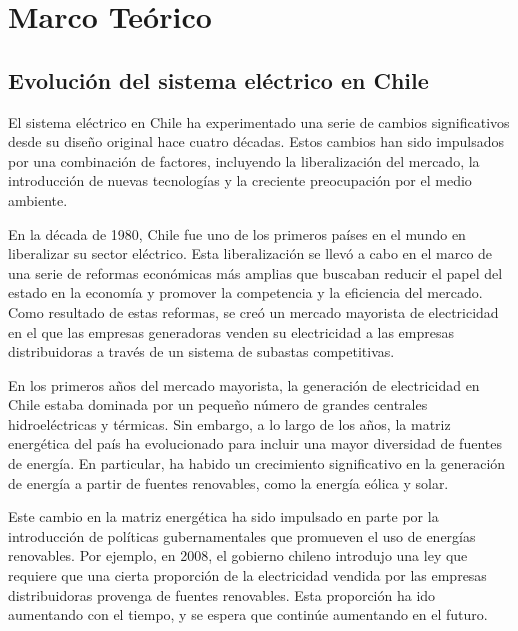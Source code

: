 
\chapter{Marco Teórico}
\label{c2} 




\section{Evolución del sistema eléctrico en Chile}\label{c21}

El sistema eléctrico en Chile ha experimentado una serie de cambios significativos desde su diseño original hace cuatro décadas. Estos cambios han sido impulsados por una combinación de factores, incluyendo la liberalización del mercado, la introducción de nuevas tecnologías y la creciente preocupación por el medio ambiente.
\vspace{2.5mm}

En la década de 1980, Chile fue uno de los primeros países en el mundo en liberalizar su sector eléctrico. Esta liberalización se llevó a cabo en el marco de una serie de reformas económicas más amplias que buscaban reducir el papel del estado en la economía y promover la competencia y la eficiencia del mercado. Como resultado de estas reformas, se creó un mercado mayorista de electricidad en el que las empresas generadoras venden su electricidad a las empresas distribuidoras a través de un sistema de subastas competitivas.
\vspace{2.5mm}

En los primeros años del mercado mayorista, la generación de electricidad en Chile estaba dominada por un pequeño número de grandes centrales hidroeléctricas y térmicas. Sin embargo, a lo largo de los años, la matriz energética del país ha evolucionado para incluir una mayor diversidad de fuentes de energía. En particular, ha habido un crecimiento significativo en la generación de energía a partir de fuentes renovables, como la energía eólica y solar.
\vspace{2.5mm}

Este cambio en la matriz energética ha sido impulsado en parte por la introducción de políticas gubernamentales que promueven el uso de energías renovables. Por ejemplo, en 2008, el gobierno chileno introdujo una ley que requiere que una cierta proporción de la electricidad vendida por las empresas distribuidoras provenga de fuentes renovables. Esta proporción ha ido aumentando con el tiempo, y se espera que continúe aumentando en el futuro.
\vspace{2.5mm}

